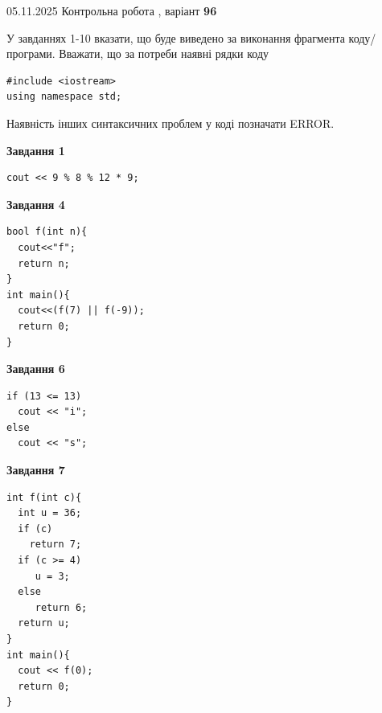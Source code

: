 \documentclass[12pt, ukrainian]{article}
\begin{document}
{\Large{05.11.2025 Контрольна робота , варіант  \No \textbf { 96 }\par}}
{
\begin {large}
У завданнях 1-10 вказати, що буде виведено за виконання фрагмента коду/про\-гра\-ми.
Вважати, що за потреби наявні рядки коду
\begin{verbatim}
#include <iostream>
using namespace std;
\end{verbatim}
Наявність інших синтаксичних проблем у коді позначати ERROR.

\begin{minipage}[t]{7.0cm}

\begin{center}
\textbf{Завдання 1}
\end{center}
\vspace{-8mm}

\begin{verbatim}
cout << 9 % 8 % 12 * 9;
\end{verbatim}



\begin{center}
\textbf{Завдання 4}
\end{center}
\vspace{-8mm}

\begin{verbatim}
bool f(int n){
  cout<<"f";
  return n;
}
int main(){
  cout<<(f(7) || f(-9));
  return 0;
}
\end{verbatim}



\begin{center}
\textbf{Завдання 6}
\end{center}
\vspace{-8mm}

\begin{verbatim}
if (13 <= 13)
  cout << "i";
else
  cout << "s";
\end{verbatim}



\begin{center}
\textbf{Завдання 7}
\end{center}
\vspace{-8mm}

\begin{verbatim}
int f(int c){
  int u = 36;
  if (c)
    return 7;
  if (c >= 4)
     u = 3;
  else
     return 6;
  return u;
}
int main(){
  cout << f(0);
  return 0;
}
\end{verbatim}


\end{minipage}
\end{large}}
\end{document}
